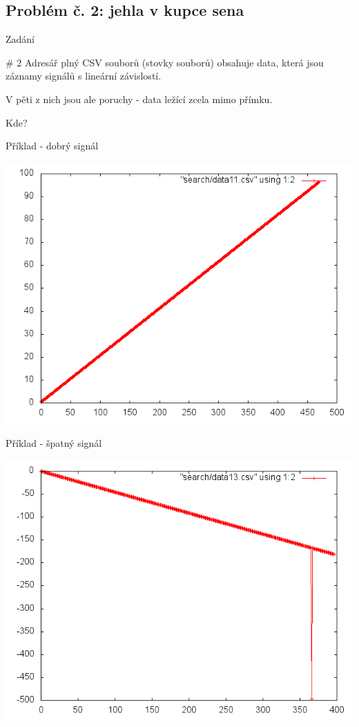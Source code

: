 \documentclass{beamer}
\begin{document}
\subsection{Problém č. 2: jehla v kupce sena}

\begin{frame}{Zadání}
  \begin{block}{\# 2}
    Adresář plný CSV souborů (stovky souborů) obsahuje data, která jsou záznamy signálů s lineární závislostí.

    V pěti z nich jsou ale poruchy - data ležící zcela mimo přímku.

    Kde?
  \end{block}
\end{frame}

\begin{frame}{Příklad - dobrý signál}
  \begin{center}
      \includegraphics[width=0.6\columnwidth]{search_good}
      \end{center}
\end{frame}
\begin{frame}{Příklad - špatný signál}
  \begin{center}
      \includegraphics[width=0.6\columnwidth]{search_bad}
      \end{center}
\end{frame}
\end{document}
